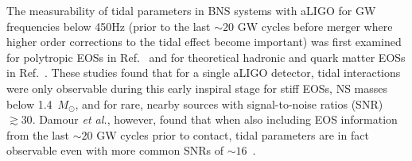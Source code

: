 \documentclass[twocolumn,prd,amssymb,aps,nofootinbib,showpacs,epsf]{revtex4}
\begin{document}
 
The measurability of tidal parameters in BNS systems with aLIGO for GW frequencies below 450Hz (prior to the last $\sim 20$ GW cycles before merger where higher order corrections to the tidal effect become important) was first examined for polytropic EOSs in Ref.~\cite{FlanaganHinderer2008} and for theoretical hadronic and quark matter EOSs in Ref.~\cite{HindererLackeyLangRead2010}.  These studies found that for a single aLIGO detector, tidal interactions were only observable during this early inspiral stage for stiff EOSs, NS masses below 1.4~$M_\odot$, and for rare, nearby sources with signal-to-noise ratios (SNR) $\gtrsim 30$. Damour {\it et al.}, however, found that when also including EOS information from the last $\sim 20$ GW cycles prior to contact, tidal parameters are in fact observable even with more common SNRs of $\sim 16$~\cite{DamourNagarVillain2012}. 
\end{document}
